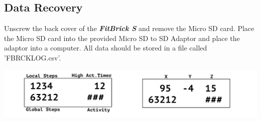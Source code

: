 \documentclass{article}
\begin{document}
\subsection{Data Recovery}
Unscrew the back cover of the \textbf{\textit{FitBrick S}} and remove the Micro SD card. Place the Micro SD card into the provided Micro SD to SD Adaptor and place the adaptor into a computer. All data should be stored in a file called 'FBRCKLOG.csv'. 
\begin{center}
	\includegraphics[width=6.5in]{screen}
\end{center}





\end{document}
